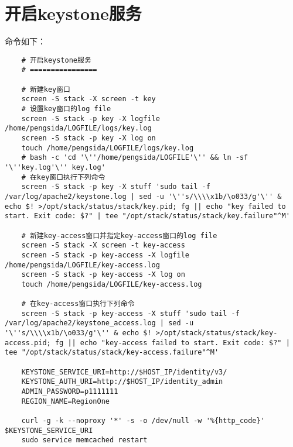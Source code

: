 \documentclass[a4paper,left=1.5cm,right=1.5cm,11pt]{article}
\begin{document}
\section{开启keystone服务}
	命令如下：
	\begin{lstlisting}
	# 开启keystone服务
	# ================

	# 新建key窗口
	screen -S stack -X screen -t key
	# 设置key窗口的log file
	screen -S stack -p key -X logfile /home/pengsida/LOGFILE/logs/key.log
	screen -S stack -p key -X log on
	touch /home/pengsida/LOGFILE/logs/key.log
	# bash -c 'cd '\''/home/pengsida/LOGFILE'\'' && ln -sf '\''key.log'\'' key.log'
	# 在key窗口执行下列命令
	screen -S stack -p key -X stuff 'sudo tail -f /var/log/apache2/keystone.log | sed -u '\''s/\\\\x1b/\o033/g'\'' & echo $! >/opt/stack/status/stack/key.pid; fg || echo "key failed to start. Exit code: $?" | tee "/opt/stack/status/stack/key.failure"^M'

	# 新建key-access窗口并指定key-access窗口的log file
	screen -S stack -X screen -t key-access
	screen -S stack -p key-access -X logfile /home/pengsida/LOGFILE/key-access.log
	screen -S stack -p key-access -X log on
	touch /home/pengsida/LOGFILE/key-access.log

	# 在key-access窗口执行下列命令
	screen -S stack -p key-access -X stuff 'sudo tail -f /var/log/apache2/keystone_access.log | sed -u '\''s/\\\\x1b/\o033/g'\'' & echo $! >/opt/stack/status/stack/key-access.pid; fg || echo "key-access failed to start. Exit code: $?" | tee "/opt/stack/status/stack/key-access.failure"^M'

	KEYSTONE_SERVICE_URI=http://$HOST_IP/identity/v3/
	KEYSTONE_AUTH_URI=http://$HOST_IP/identity_admin
	ADMIN_PASSWORD=p1111111
	REGION_NAME=RegionOne

	curl -g -k --noproxy '*' -s -o /dev/null -w '%{http_code}' $KEYSTONE_SERVICE_URI
	sudo service memcached restart
	\end{lstlisting}
\end{document}
